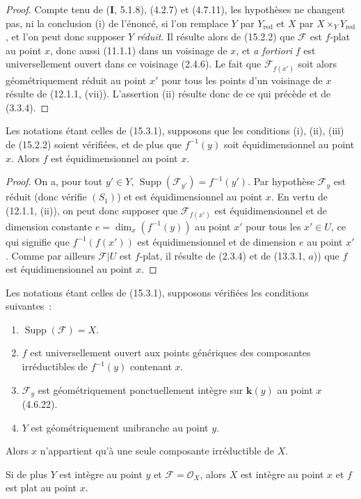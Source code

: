 \begin{proof}
Compte tenu de (\textbf{I}, 5.1.8), (4.2.7) et (4.7.11), les hypothèses ne
changent pas, ni la conclusion (i) de l'énoncé, si l'on remplace $Y$ par
$Y_{\mathrm{red}}$ et $X$ par $X\times_Y Y_{\mathrm{red}}$, et l'on peut donc
supposer $Y$ \emph{réduit}. Il résulte alors de (15.2.2) que $\mathcal F$ est
$f$-plat au point $x$, donc aussi (11.1.1) dans un voisinage de $x$, et
\emph{a fortiori} $f$ est universellement ouvert dans ce voisinage (2.4.6). Le
fait que $\mathcal F_{f(x')}$ soit alors géométriquement réduit au point $x'$
pour tous les points d'un voisinage de $x$ résulte de (12.1.1, (vii)).
L'assertion (ii) résulte donc de ce qui précède et de (3.3.4).
\end{proof}

\begin{proposition}[15.3.2]
\label{IV.15.3.2-fr}
Les notations étant celles de (15.3.1), supposons que les conditions (i), (ii),
(iii) de (15.2.2) soient vérifiées, et de plus que $f^{-1}(y)$ soit
équidimensionnel au point $x$. Alors $f$ est équidimensionnel au point $x$.
\end{proposition}

\begin{proof}
On a, pour tout $y'\in Y$, $\operatorname{Supp}(\mathcal F_{y'})=f^{-1}(y')$.
Par hypothèse $\mathcal F_y$ est réduit (donc vérifie $(S_1)$) et est
équidimensionnel au point $x$. En vertu de (12.1.1, (ii)), on peut donc supposer
que $\mathcal F_{f(x')}$ est équidimensionnel et de dimension constante
$e=\dim_x(f^{-1}(y))$ au point $x'$ pour tous les $x'\in U$, ce qui signifie que
$f^{-1}(f(x'))$ est équidimensionnel et de dimension $e$ au point $x'$. Comme
par ailleurs $\mathcal F|U$ est $f$-plat, il résulte de (2.3.4) et de
(13.3.1, $a$)) que $f$ est équidimensionnel au point $x$.
\end{proof}

\begin{corollary}[15.3.3]
\label{IV.15.3.3-fr}
Les notations étant celles de (15.3.1), supposons vérifiées les conditions
suivantes~:
\begin{enumerate}[label=(\roman*)]
  \item $\operatorname{Supp}(\mathcal F)=X$.
  \item $f$ est universellement ouvert aux points génériques des composantes
  irréductibles de $f^{-1}(y)$ contenant $x$.
  \item $\mathcal F_y$ est géométriquement ponctuellement intègre sur
  $\mathbf{k}(y)$ au point $x$ (4.6.22).
  \item $Y$ est géométriquement unibranche au point $y$.
\end{enumerate}
Alors $x$ n'appartient qu'à une seule composante irréductible de $X$.

Si de plus $Y$ est intègre au point $y$ et $\mathcal F=\mathcal O_X$, alors $X$
est intègre au point $x$ et $f$ est plat au point $x$.
\end{corollary}

